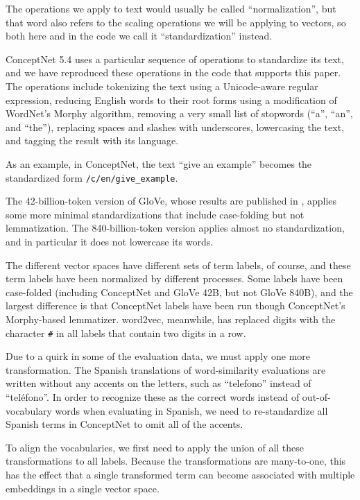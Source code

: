 \documentclass[11pt,letterpaper]{article}
\begin{document}
The operations we apply to text would usually be called ``normalization'',
but that word also refers to the scaling operations we will be applying to
vectors, so both here and in the code we call it ``standardization'' instead.

ConceptNet 5.4 uses a particular sequence of operations to standardize its
text, and we have reproduced these operations in the code that supports this
paper.  The operations include tokenizing the text using a Unicode-aware
regular expression, reducing English words to their root forms using a
modification of WordNet's Morphy algorithm, removing a very small list of
stopwords (``a'', ``an'', and ``the''), replacing spaces and slashes with
underscores, lowercasing the text, and tagging the result with its language.

As an example, in ConceptNet, the text ``give an example'' becomes the
standardized form {\tt /c/en/give\_example}.

The 42-billion-token version of GloVe, whose results are published in
\cite{pennington2014glove}, applies some more minimal standardizations that
include case-folding but not lemmatization. The 840-billion-token version
applies almost no standardization, and in particular it does not lowercase its
words.

The different vector spaces have different sets of term labels, of course, and
these term labels have been normalized by different processes. Some labels
have been case-folded (including ConceptNet and GloVe 42B, but not GloVe 840B),
and the largest difference is that ConceptNet labels have been run though
ConceptNet's Morphy-based lemmatizer. word2vec, meanwhile, has replaced digits
with the character {\tt \#} in all labels that contain two digits in a row.

Due to a quirk in some of the evaluation data, we must apply one more
transformation. The Spanish translations of word-similarity evaluations
\cite{hassan2009crosslingual} are written without any accents on the letters,
such as ``telefono'' instead of ``tel\'{e}fono''. In order to recognize these as
the correct words instead of out-of-vocabulary words when evaluating in Spanish,
we need to re-standardize all Spanish terms in ConceptNet to omit all of the
accents.

To align the vocabularies, we first need to apply the union of all these
transformations to all labels. Because the transformations are many-to-one, this
has the effect that a single transformed term can become associated with
multiple embeddings in a single vector space.
\end{document}
